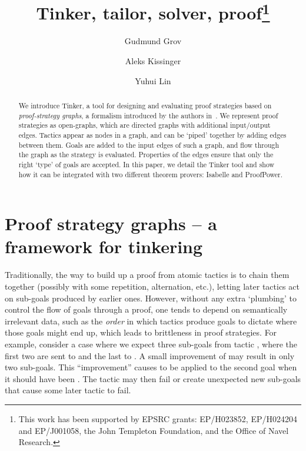 \documentclass[submission,copyright,creativecommons]{eptcs}
\title{Tinker, tailor, solver, proof\thanks{This work has been supported by EPSRC grants: EP/H023852, EP/H024204 and EP/J001058, the John Templeton Foundation, and the Office of Navel Research.}}
\author{Gudmund Grov
\institute{Heriot-Watt University, Edinburgh, UK} 
\email{G.Grov@hw.ac.uk}
\and
Aleks Kissinger
\institute{University of Oxford, UK} 
\email{alek@cs.ox.ac.uk}
\and 
Yuhui Lin
\institute{Heriot-Watt University, Edinburgh, UK} 
\email{Y.Lin@hw.ac.uk}
}
\begin{document}
\maketitle

\begin{abstract}
We introduce Tinker, a tool for designing and evaluating proof strategies based on \textit{proof-strategy graphs}, a formalism introduced by the authors in~\cite{LPAR13}. We represent proof strategies as open-graphs, which are directed graphs with additional input/output edges. Tactics appear as nodes in a graph, and can be `piped' together by adding edges between them. Goals are added to the input edges of such a graph, and flow through the graph as the strategy is evaluated. Properties of the edges ensure that only the right `type' of goals are accepted. In this paper, we detail the Tinker tool and show how it can be integrated with two different theorem provers: Isabelle and ProofPower.
\end{abstract}

\section{Proof strategy graphs -- a framework for tinkering}

Traditionally, the way to build up a proof from atomic tactics is to chain them together (possibly with some repetition, alternation, etc.), letting later tactics act on sub-goals produced by earlier ones. However, without any extra `plumbing' to control the flow of goals through a proof, one tends to depend on semantically irrelevant data, such as the \textit{order} in which tactics produce goals to dictate where those goals might end up, which leads to brittleness in proof strategies. For example, consider a case where we expect three sub-goals from tactic , where the first two are sent to  and the last to . A small improvement of  may result in only two sub-goals. This ``improvement'' causes  to be applied to the second goal when it should have been . The tactic  may then fail or create unexpected new sub-goals that cause some later tactic to fail.
\end{document}

